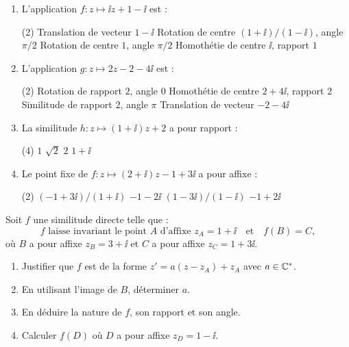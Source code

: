 \begin{enumerate}
	\item L'application $f : z \mapsto \ii z + 1 - \ii$ est :
	\begin{qcm}(2)
		\task Translation de vecteur $1 - \ii$
		\task Rotation de centre $(1+\ii)/(1-\ii)$, angle $\pi/2$
		\task Rotation de centre $1$, angle $\pi/2$
		\task Homothétie de centre $\ii$, rapport $1$
	\end{qcm}

	\item L'application $g : z \mapsto 2z - 2 - 4\ii$ est :
	\begin{qcm}(2)
		\task Rotation de rapport $2$, angle $0$
		\task Homothétie de centre $2 + 4\ii$, rapport $2$
		\task Similitude de rapport $2$, angle $\pi$
		\task Translation de vecteur $-2 - 4\ii$
	\end{qcm}

	\item La similitude $h : z \mapsto (1+\ii)z + 2$ a pour rapport :
	\begin{qcm}(4)
		\task $1$
		\task $\sqrt{2}$
		\task $2$
		\task $1 + \ii$
	\end{qcm}

	\item Le point fixe de $f : z \mapsto (2+\ii)z - 1 + 3\ii$ a pour affixe :
	\begin{qcm}(2)
		\task $(-1+3\ii)/(1+\ii)$
		\task $-1 - 2\ii$
		\task $(1-3\ii)/(1-\ii)$
		\task $-1 + 2\ii$
	\end{qcm}
\end{enumerate}



Soit $f$ une similitude directe telle que :
$$
f\text{ laisse invariant le point }A \text{ d'affixe } z_A = 1 + \ii
\quad \text{et} \quad
f(B) = C,
$$
où $B$ a pour affixe $z_B = 3 + \ii$ et $C$ a pour affixe $z_C = 1 + 3\ii$.

\begin{enumerate}
	\item Justifier que $f$ est de la forme $z' = a(z - z_A) + z_A$
	avec $a \in \mathbb{C}^*$.
	\item En utilisant l'image de $B$, déterminer $a$.
	\item En déduire la nature de $f$, son rapport et son angle.
	\item Calculer $f(D)$ où $D$ a pour affixe $z_D = 1 - \ii$.
\end{enumerate}


